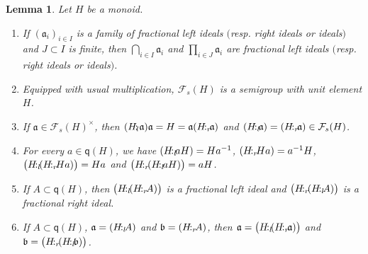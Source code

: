 \documentclass[a4paper]{amsart}
\newtheorem{lemma}[theorem]{Lemma}
\theoremstyle{definition}
\numberwithin{equation}{section}
\begin{document}
\medskip
\begin{lemma} \label{3.4}
Let $H$ be a monoid.
\begin{enumerate}
\item If $(\mathfrak a_i)_{i \in I}$ is a family of fractional left ideals $($resp. right ideals or ideals$)$ and $J \subset I$ is finite,
      then $\bigcap_{i \in I} \mathfrak a_i$ and $\prod_{i \in J} \mathfrak a_i$
      are fractional left ideals $($resp. right ideals or ideals$)$.

\smallskip
\item Equipped with usual multiplication, $\mathcal F_s (H)$ is a semigroup with unit element $H$.

\smallskip
\item If $\mathfrak a \in \mathcal F_s (H)^{\times}$, then $(H {\negthinspace : \negthinspace}_l \mathfrak a) \mathfrak a = H = \mathfrak a (H {\negthinspace :_r \negthinspace} \mathfrak a)$ and
      $(H {\negthinspace :_l \negthinspace} \mathfrak a) = (H {\negthinspace :_r \negthinspace} \mathfrak a) \in \mathcal F_s (H)$.

\smallskip
\item For every $a \in \mathsf q (H)$, we have $(H {\negthinspace :_l \negthinspace} aH) = Ha^{-1}$, $(H {\negthinspace :_r \negthinspace} Ha) =
      a^{-1}H$, $\big( H {\negthinspace :_l \negthinspace} (H {\negthinspace :_r \negthinspace} Ha) \big) = Ha$ and $\big( H {\negthinspace :_r \negthinspace} (H
      {\negthinspace :_l \negthinspace} aH) \big) = aH$.

\smallskip
\item If $A \subset \mathsf q (H)$, then
      $\big( H {\negthinspace :_l \negthinspace} (H {\negthinspace :_r \negthinspace} A) \big)$ is a fractional
      left ideal and $\big( H {\negthinspace :_r \negthinspace} (H {\negthinspace :_l \negthinspace} A)\big)$ is a fractional
      right ideal.

\smallskip
\item If $A \subset \mathsf q (H)$, $\mathfrak a = (H {\negthinspace :_l \negthinspace} A)$ and $\mathfrak b = (H {\negthinspace :_r \negthinspace} A)$, then $\mathfrak a =  \big( H {\negthinspace :_l \negthinspace} (H {\negthinspace :_r \negthinspace}
      \mathfrak a)\big)$ and $\mathfrak b = \big( H {\negthinspace :_r \negthinspace} (H {\negthinspace :_l \negthinspace} \mathfrak b)\big)$.
\end{enumerate}
\end{lemma}
\end{document}
